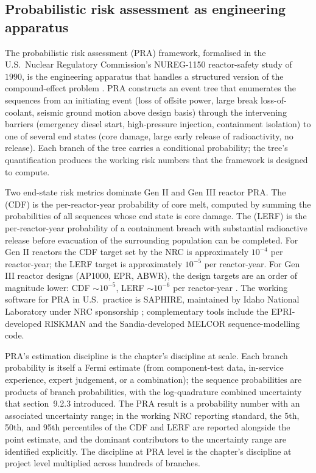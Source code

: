 \subsection{Probabilistic risk assessment as engineering apparatus}

The probabilistic risk assessment (PRA) framework, formalised
in the U.S.\ Nuclear Regulatory Commission's NUREG-1150
reactor-safety study of $1990$, is the engineering apparatus
that handles a structured version of the compound-effect
problem \cite{paper:ch09t3-nureg-1150}. PRA constructs an
event tree that enumerates the sequences from an initiating
event (loss of offsite power, large break loss-of-coolant,
seismic ground motion above design basis) through the
intervening barriers (emergency diesel start, high-pressure
injection, containment isolation) to one of several end
states (core damage, large early release of radioactivity, no
release). Each branch of the tree carries a conditional
probability; the tree's quantification produces the working
risk numbers that the framework is designed to compute.

Two end-state risk metrics dominate Gen II and Gen III
reactor PRA. The  (CDF) is the
per-reactor-year probability of core melt, computed by summing
the probabilities of all sequences whose end state is core
damage. The  (LERF) is
the per-reactor-year probability of a containment breach with
substantial radioactive release before evacuation of the
surrounding population can be completed. For Gen II reactors
the CDF target set by the NRC is approximately $10^{-4}$ per
reactor-year; the LERF target is approximately $10^{-5}$ per
reactor-year. For Gen III reactor designs (AP1000, EPR,
ABWR), the design targets are an order of magnitude lower:
CDF $\sim 10^{-5}$, LERF $\sim 10^{-6}$ per reactor-year
\cite{paper:ch09t3-nureg-1150}. The working software for PRA
in U.S.\ practice is SAPHIRE, maintained by Idaho National
Laboratory under NRC sponsorship
\cite{paper:ch09t3-saphire}; complementary tools include the
EPRI-developed RISKMAN and the Sandia-developed MELCOR
sequence-modelling code.

PRA's estimation discipline is the chapter's discipline at
scale. Each branch probability is itself a Fermi estimate
(from component-test data, in-service experience, expert
judgement, or a combination); the sequence probabilities are
products of branch probabilities, with the log-quadrature
combined uncertainty that section~9.2.3 introduced. The PRA
result is a probability number with an associated uncertainty
range; in the working NRC reporting standard, the 5th, 50th,
and 95th percentiles of the CDF and LERF are reported
alongside the point estimate, and the dominant contributors
to the uncertainty range are identified explicitly. The
discipline at PRA level is the chapter's discipline at
project level multiplied across hundreds of branches.

